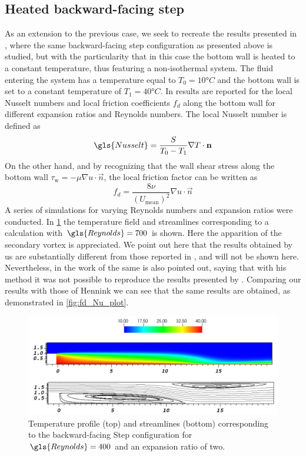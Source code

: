 \subsection{Heated backward-facing step}
As an extension to the previous case, we seek to recreate the results presented in \cite{xieFluidFlowHeat2016}, where the same backward-facing step configuration as presented above is studied, but with the particularity that in this case the bottom wall is heated to a constant temperature, thus featuring a non-isothermal system. The fluid entering the system has a temperature equal to $T_0 = 10°C$ and the bottom wall is set to a constant temperature of $T_1 = 40°C$. 
In \cite{xieFluidFlowHeat2016} results are reported for the local Nusselt numbers and local friction coefficients $f_d$  along the bottom wall for different expansion ratios and Reynolds numbers. The local Nusselt number is defined as
\begin{equation}
\gls{Nusselt} = \frac{S}{T_0-T_1}\nabla T \cdot \vec{n}
\end{equation}
On the other hand, and by recognizing that the wall shear stress along the bottom wall $\tau_{\text{w}} = -\mu \nabla u \cdot \vec{n}$, the local friction factor can be written as
\begin{equation}
f_d = \frac{8\nu} { (U_{\text{mean}})^2}  \nabla u \cdot \vec{n} 
\end{equation}
A series of simulations for varying Reynolds numbers and expansion ratios were conducted. In \cref{BFS_Streamlines} the temperature field and streamlines corresponding to a calculation with $\gls{Reynolds} = 700$ is shown. Here the apparition of the secondary vortex is appreciated. We point out here that the results obtained by us are substantially different from those reported in \cite{xieFluidFlowHeat2016}, and will not be shown here.
Nevertheless, in the work of \cite{henninkLowMachNumberFlow2022} the same is also pointed out, saying that with his method it was not possible to reproduce the results presented by \cite{xieFluidFlowHeat2016}. Comparing our results with those of Hennink we can see that the same results are obtained, as demonstrated in \cref{fig:fd_Nu_plot}.

\begin{figure}[tb]
	\begin{center}
		\includegraphics[width=\linewidth]{../plots/HBFS_TemperatureRe700.pdf}
		\caption{Temperature profile (top) and streamlines (bottom) corresponding to the backward-facing Step configuration for $\gls{Reynolds} = 400$ and an expansion ratio of two.}
		\label{BFS_Streamlines}
	\end{center}	
\end{figure} 


